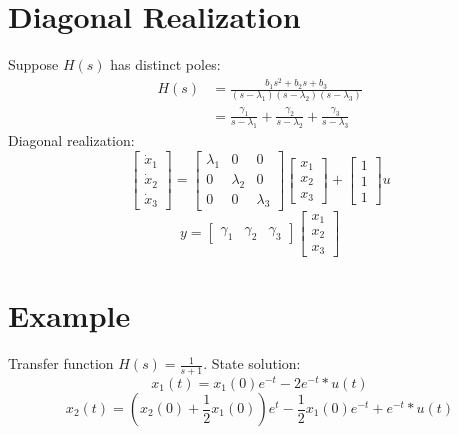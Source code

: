\documentclass[10pt,a4paper,oneside]{article}
\begin{document}
\section{Diagonal Realization}
Suppose $H(s)$ has distinct poles:
\[
\begin{aligned} H(s) &=\frac{b_{1} s^{2}+b_{2} s+b_{3}}{\left(s-\lambda_{1}\right)\left(s-\lambda_{2}\right)\left(s-\lambda_{3}\right)} \\ &=\frac{\gamma_{1}}{s-\lambda_{1}}+\frac{\gamma_{2}}{s-\lambda_{2}}+\frac{\gamma_{3}}{s-\lambda_{3}} \end{aligned}
\]
Diagonal realization:
\[
\left[\begin{array}{c}{\dot{x}_{1}} \\ {\dot{x}_{2}} \\ {\dot{x}_{3}}\end{array}\right]=\left[\begin{array}{ccc}{\lambda_{1}} & {0} & {0} \\ {0} & {\lambda_{2}} & {0} \\ {0} & {0} & {\lambda_{3}}\end{array}\right]\left[\begin{array}{c}{x_{1}} \\ {x_{2}} \\ {x_{3}}\end{array}\right]+\left[\begin{array}{c}{1} \\ {1} \\ {1}\end{array}\right] u
\]
\[
y=\left[\begin{array}{lll}{\gamma_{1}} & {\gamma_{2}} & {\gamma_{3}}\end{array}\right]\left[\begin{array}{l}{x_{1}} \\ {x_{2}} \\ {x_{3}}\end{array}\right]
\]
\section{Example}
Transfer function $H(s)=\frac{1}{s+1}$.
State solution:
\[
x_{1}(t)=x_{1}(0) e^{-t}-2 e^{-t} * u(t)
\]
\[
x_{2}(t)=(x_{2}(0)+\frac{1}{2} x_{1}(0)) e^{t}-\frac{1}{2} x_{1}(0) e^{-t}+e^{-t} * u(t)
\]
\end{document}
